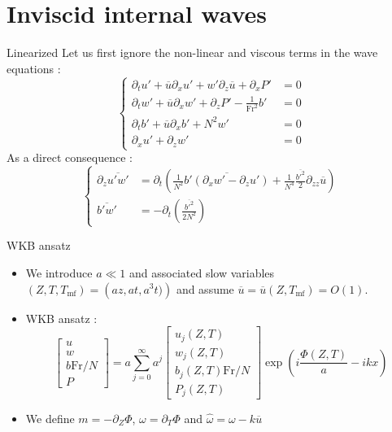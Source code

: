 \documentclass[10pt]{beamer}
\begin{document}
\section{Inviscid internal waves}

\begin{frame}{Linearized}
	Let us first ignore the non\--linear and viscous terms in the wave equations :
	\begin{equation*}
    	\begin{cases}
    	 	\partial_{t}u'+\overline{u}\partial_{x}u'+w'\partial_{z}\overline{u} + \partial_{x}P'&=0\\
     	 	\partial_{t}w'+\overline{u}\partial_{x}w'+\partial_{z}P'-\frac{1}{\mathrm{Fr}^{2}}b'&=0\\
     		\partial_{t}b'+\overline{u}\partial_{x}b'+N^{2}w'&=0\\
    	 	\partial_{x}u'+\partial_{z}w'&=0
   		\end{cases}
  	\end{equation*}
  	As a direct consequence :
  	\begin{equation*}
  		\begin{cases}
  			\partial_{z}\overline{u'w'}&=\partial_{t}\left(\frac{1}{N^{2}}\overline{b'\left(\partial_{x}w'-\partial_{z}u' \right)}+\frac{1}{N^{4}}\frac{\overline{b'^{2}}}{2}\partial_{zz}\overline{u} \right)\\
  			\overline{b'w'}&=-\partial_{t}\left(\frac{\overline{b'^{2}}}{2N^{2}}\right)
  		\end{cases}
  	\end{equation*}
\end{frame}

\begin{frame}[fragile]{WKB ansatz} 
  \begin{itemize}
  	\item We introduce $a\ll1$ and associated slow variables $\left(Z,T,T_{\mathrm{mf}}\right)=\left(az,at,a^{3}t)\right)$ and assume  $\overline{u}=\overline{u}\left(Z,T_{\mathrm{mf}}\right)=O\left(1\right)$.\\
  	\item WKB ansatz :
  	\begin{equation*}
    	\begin{bmatrix}
    		u\\
    		w\\
    		b\mathrm{Fr}/N\\
    		P
    	\end{bmatrix}
    	=a\sum_{j=0}^{\infty}a^{j}
    	\begin{bmatrix}
    	u_{j}\left(Z,T\right)\\
    	w_{j}\left(Z,T\right)\\
    	b_{j}\left(Z,T\right)\mathrm{Fr}/N\\
    	P_{j}\left(Z,T\right)
    	\end{bmatrix}
    	\exp\left(i\frac{\Phi\left(Z,T\right)}{a}-ikx \right)
  	\end{equation*}
  	\item We define $m=-\partial_{Z}\Phi $, $\omega=\partial_{T}\Phi $ and $\hat{\omega}=\omega-k\overline{u}$
  \end{itemize}
\end{frame}
\end{document}
